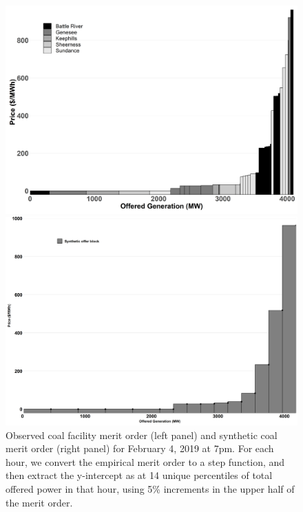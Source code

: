 \documentclass[12pt]{article}
\begin{document}
\begin{figure}[!htb]
    \centering
    \begin{minipage}{.5\textwidth}
        \centering
        \includegraphics[width=.9\textwidth]{../images/coal_merit.png}
    \end{minipage}%
    \begin{minipage}{0.5\textwidth}
        \centering
        \includegraphics[width=.9\textwidth]{../images/coal_synth_merit}
    \end{minipage}
    \caption{Observed coal facility merit order (left panel) and synthetic coal merit order (right panel) for February 4, 2019 at 7pm. For each hour, we convert the empirical merit order to a step function, and then extract the y-intercept as at 14 unique percentiles of total offered power in that hour, using 5\% increments in the upper half of the merit order.}
    \label{fig:synth_merit}
\end{figure}
\end{document}
